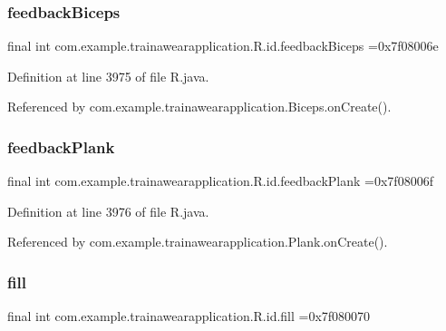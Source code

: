 \subsubsection{\texorpdfstring{feedbackBiceps}{feedbackBiceps}}
{\footnotesize\ttfamily final int com.\+example.\+trainawearapplication.\+R.\+id.\+feedback\+Biceps =0x7f08006e\hspace{0.3cm}{\ttfamily [static]}}



Definition at line 3975 of file R.\+java.



Referenced by com.\+example.\+trainawearapplication.\+Biceps.\+on\+Create().

\mbox{\label{classcom_1_1example_1_1trainawearapplication_1_1_r_1_1id_a4a49531b46a14e2ebfa83ef2568b4da0}} 
\subsubsection{\texorpdfstring{feedbackPlank}{feedbackPlank}}
{\footnotesize\ttfamily final int com.\+example.\+trainawearapplication.\+R.\+id.\+feedback\+Plank =0x7f08006f\hspace{0.3cm}{\ttfamily [static]}}



Definition at line 3976 of file R.\+java.



Referenced by com.\+example.\+trainawearapplication.\+Plank.\+on\+Create().

\mbox{\label{classcom_1_1example_1_1trainawearapplication_1_1_r_1_1id_ac53bd4cb9a5ea00b0086475e80f266bd}} 
\subsubsection{\texorpdfstring{fill}{fill}}
{\footnotesize\ttfamily final int com.\+example.\+trainawearapplication.\+R.\+id.\+fill =0x7f080070\hspace{0.3cm}{\ttfamily [static]}}



